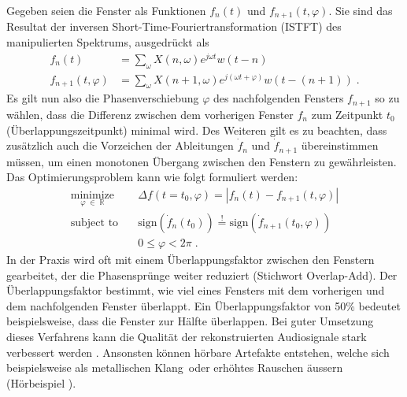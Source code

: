 Gegeben seien die Fenster als Funktionen $f_n(t)$ und $f_{n+1}(t, \varphi)$.
Sie sind das Resultat der inversen Short-Time-Fouriertransformation (ISTFT) des manipulierten Spektrums,
ausgedrückt als
\begin{equation}
    \begin{aligned}
        f_n(t)
        &=
        \sum_{\omega} X(n, \omega) e^{j\omega t} w(t - n) \\
        f_{n+1}(t, \varphi)
        &=
        \sum_{\omega} X(n+1, \omega) e^{j(\omega t + \varphi)} w(t - (n+1)) \;.
    \end{aligned}
\end{equation}
Es gilt nun also die Phasenverschiebung $\varphi$ des nachfolgenden Fensters $f_{n+1}$ so zu wählen,
dass die Differenz zwischen dem vorherigen Fenster $f_n$ zum Zeitpunkt $t_0$ (Überlappungszeitpunkt) minimal wird.
Des Weiteren gilt es zu beachten, dass zusätzlich auch die Vorzeichen der Ableitungen $\dot{f}_n$ und $\dot{f}_{n+1}$ übereinstimmen müssen,
um einen monotonen Übergang zwischen den Fenstern zu gewährleisten.
Das Optimierungsproblem kann wie folgt formuliert werden:
\begin{equation}
    \begin{aligned}
        \underset{\varphi \; \in \; \mathbb{R}}{\text{minimize}}
        & \quad
        \Delta f(t=t_0, \varphi) = |f_n(t) - f_{n + 1}(t, \varphi)| \\
        \text{subject to}
        & \quad
        \text{sign}(\dot{f}_n(t_0)) \stackrel{!}{=} \text{sign}(\dot{f}_{n + 1}(t_0, \varphi)) \\
        & \quad
        0 \leq \varphi < 2\pi \;.
    \end{aligned}
\end{equation}
In der Praxis wird oft mit einem Überlappungsfaktor zwischen den Fenstern gearbeitet, der die Phasensprünge weiter reduziert (Stichwort Overlap-Add).
Der Überlappungsfaktor bestimmt, wie viel eines Fensters mit dem vorherigen und dem nachfolgenden Fenster überlappt.
Ein Überlappungsfaktor von 50\% bedeutet beispielsweise, dass die Fenster zur Hälfte überlappen.
Bei guter Umsetzung dieses Verfahrens kann die Qualität der rekonstruierten Audiosignale stark verbessert werden \cite{autotune:phaseVocoderTheroyAndPractice}.
Ansonsten können hörbare Artefakte entstehen, welche sich beispielsweise als \glqq metallischen Klang\grqq\ oder erhöhtes Rauschen äussern (Hörbeispiel \cite{autotune:audioExampleReconstructionArtefacts}).
